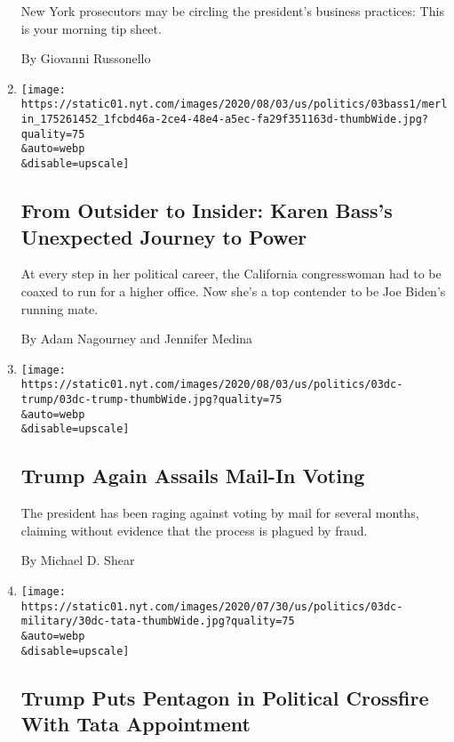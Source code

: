 \begin{enumerate}
  New York prosecutors may be circling the president's business
  practices: This is your morning tip sheet.

  By Giovanni Russonello
\item
  \href{/2020/08/04/us/politics/karen-bass-vice-president-biden.html}{}

  \texttt{[image: https://static01.nyt.com/images/2020/08/03/us/politics/03bass1/merlin\_175261452\_1fcbd46a-2ce4-48e4-a5ec-fa29f351163d-thumbWide.jpg?quality=75\\\&auto=webp\\\&disable=upscale]}

  \hypertarget{from-outsider-to-insider-karen-basss-unexpected-journey-to-power}{%
  \subsection{From Outsider to Insider: Karen Bass's Unexpected Journey
  to
  Power}\label{from-outsider-to-insider-karen-basss-unexpected-journey-to-power}}

  At every step in her political career, the California congresswoman
  had to be coaxed to run for a higher office. Now she's a top contender
  to be Joe Biden's running mate.

  By Adam Nagourney and Jennifer Medina
\item
  \href{/2020/08/03/us/politics/trump-mail-in-voting.html}{}

  \texttt{[image: https://static01.nyt.com/images/2020/08/03/us/politics/03dc-trump/03dc-trump-thumbWide.jpg?quality=75\\\&auto=webp\\\&disable=upscale]}

  \hypertarget{trump-again-assails-mail-in-voting}{%
  \subsection{Trump Again Assails Mail-In
  Voting}\label{trump-again-assails-mail-in-voting}}

  The president has been raging against voting by mail for several
  months, claiming without evidence that the process is plagued by
  fraud.

  By Michael D. Shear
\item
  \href{/2020/08/03/us/politics/tata-pentagon.html}{}

  \texttt{[image: https://static01.nyt.com/images/2020/07/30/us/politics/03dc-military/30dc-tata-thumbWide.jpg?quality=75\\\&auto=webp\\\&disable=upscale]}

  \hypertarget{trump-puts-pentagon-in-political-crossfire-with-tata-appointment}{%
  \subsection{Trump Puts Pentagon in Political Crossfire With Tata
  Appointment}\label{trump-puts-pentagon-in-political-crossfire-with-tata-appointment}}


\end{enumerate}
